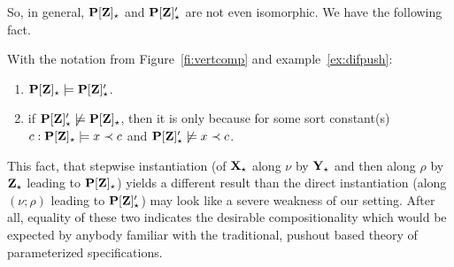 %
So, in general, ${\bf P[Z]_\star}$
and ${\bf P[Z]'_\star}$ are not even isomorphic. We have the following fact.
\begin{fact}\label{fa:pzpz}
With the notation from Figure~\ref{fi:vertcomp} and
example~\ref{ex:difpush}:
\begin{enumerate}\MyLPar
\item ${\bf P[Z]_\star}\models {\bf P[Z]'_\star}$.
\item if ${\bf P[Z]'_\star}\not\models {\bf P[Z]_\star}$, then it is only
because for some sort constant(s) $c: {\bf P[Z]_\star}\models x\prec c$ and
${\bf P[Z]'_\star}\not\models x\prec c$. 
\end{enumerate}
\end{fact}
%
This fact, that stepwise instantiation (of ${\bf X}_\star$ along $\nu$ by
${\bf Y}_\star$ and then along $\rho$ by
${\bf Z}_\star$ leading to ${\bf P[Z]_\star}$) yields a different result than the direct instantiation
(along $(\nu;\rho)$ leading to ${\bf P[Z]'_\star}$) may look like a severe weakness of our
setting. After all, equality of these two indicates the desirable
compositionality which would be expected by anybody familiar with the
traditional, pushout based theory of parameterized specifications. 

